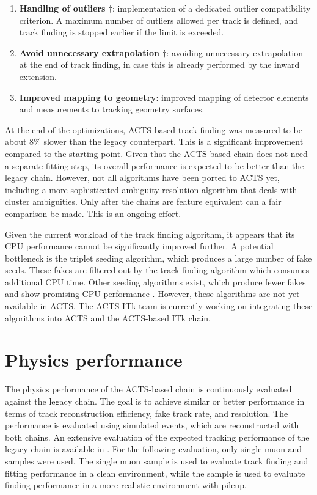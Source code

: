 \begin{enumerate}
    \item \textbf{Handling of outliers $\dagger$}: implementation of a dedicated outlier compatibility criterion. A maximum number of outliers allowed per track is defined, and track finding is stopped earlier if the limit is exceeded.
    \item \textbf{Avoid unnecessary extrapolation $\dagger$}: avoiding unnecessary extrapolation at the end of track finding, in case this is already performed by the inward extension.
    \item \textbf{Improved mapping to geometry}: improved mapping of detector elements and measurements to tracking geometry surfaces.
\end{enumerate}

At the end of the optimizations, ACTS-based track finding was measured to be about 8\% slower than the legacy counterpart. This is a significant improvement compared to the starting point. Given that the ACTS-based chain does not need a separate fitting step, its overall performance is expected to be better than the legacy chain. However, not all algorithms have been ported to ACTS yet, including a more sophisticated ambiguity resolution algorithm that deals with cluster ambiguities. Only after the chains are feature equivalent can a fair comparison be made. This is an ongoing effort.

Given the current workload of the track finding algorithm, it appears that its CPU performance cannot be significantly improved further. A potential bottleneck is the triplet seeding algorithm, which produces a large number of fake seeds. These fakes are filtered out by the track finding algorithm which consumes additional CPU time. Other seeding algorithms exist, which produce fewer fakes and show promising CPU performance \cite{acts-gbts}. However, these algorithms are not yet available in ACTS. The ACTS-ITk team is currently working on integrating these algorithms into ACTS and the ACTS-based ITk chain.

\section{Physics performance}
\label{sec:perf/itk/physics-performance}

The physics performance of the ACTS-based chain is continuously evaluated against the legacy chain. The goal is to achieve similar or better performance in terms of track reconstruction efficiency, fake track rate, and resolution. The performance is evaluated using simulated events, which are reconstructed with both chains. An extensive evaluation of the expected tracking performance of the legacy chain is available in \textcite{itk-tracking-performance}. For the following evaluation, only single muon and \ttbar samples were used. The single muon sample is used to evaluate track finding and fitting performance in a clean environment, while the \ttbar sample is used to evaluate finding performance in a more realistic environment with pileup.

